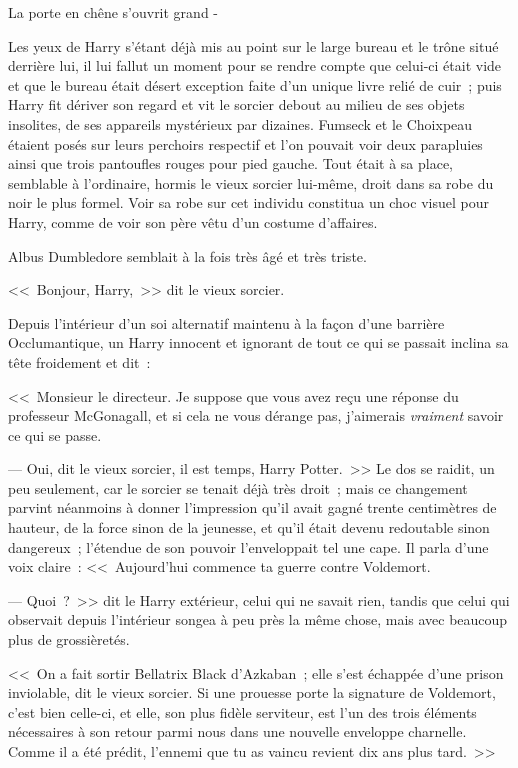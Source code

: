 La porte en chêne s'ouvrit grand -

Les yeux de Harry s'étant déjà mis au point sur le large bureau et le trône situé derrière lui, il lui fallut un moment pour se rendre compte que celui-ci était vide et que le bureau était désert exception faite d'un unique livre relié de cuir~; puis Harry fit dériver son regard et vit le sorcier debout au milieu de ses objets insolites, de ses appareils mystérieux par dizaines. Fumseck et le Choixpeau étaient posés sur leurs perchoirs respectif et l'on pouvait voir deux parapluies ainsi que trois pantoufles rouges pour pied gauche. Tout était à sa place, semblable à l'ordinaire, hormis le vieux sorcier lui-même, droit dans sa robe du noir le plus formel. Voir sa robe sur cet individu constitua un choc visuel pour Harry, comme de voir son père vêtu d'un costume d'affaires.

Albus Dumbledore semblait à la fois très âgé et très triste.

<<~Bonjour, Harry,~>> dit le vieux sorcier.

Depuis l'intérieur d'un soi alternatif maintenu à la façon d'une barrière Occlumantique, un Harry innocent et ignorant de tout ce qui se passait inclina sa tête froidement et dit~:

<<~Monsieur le directeur. Je suppose que vous avez reçu une réponse du professeur McGonagall, et si cela ne vous dérange pas, j'aimerais \emph{vraiment} savoir ce qui se passe.

--- Oui, dit le vieux sorcier, il est temps, Harry Potter.~>> Le dos se raidit, un peu seulement, car le sorcier se tenait déjà très droit~; mais ce changement parvint néanmoins à donner l'impression qu'il avait gagné trente centimètres de hauteur, de la force sinon de la jeunesse, et qu'il était devenu redoutable sinon dangereux~; l'étendue de son pouvoir l'enveloppait tel une cape. Il parla d'une voix claire~: <<~Aujourd'hui commence ta guerre contre Voldemort.

--- Quoi~?~>> dit le Harry extérieur, celui qui ne savait rien, tandis que celui qui observait depuis l'intérieur songea à peu près la même chose, mais avec beaucoup plus de grossièretés.

<<~On a fait sortir Bellatrix Black d'Azkaban~; elle s'est échappée d'une prison inviolable, dit le vieux sorcier. Si une prouesse porte la signature de Voldemort, c'est bien celle-ci, et elle, son plus fidèle serviteur, est l'un des trois éléments nécessaires à son retour parmi nous dans une nouvelle enveloppe charnelle. Comme il a été prédit, l'ennemi que tu as vaincu revient dix ans plus tard.~>>


